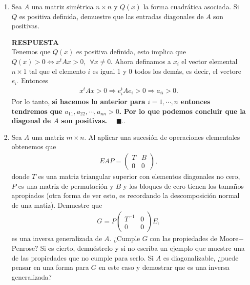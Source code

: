\documentclass[11pt,letterpaper]{article}
\newcommand{\res}{\textbf{RESPUESTA}\\}
\newcommand{\fin}{$\blacksquare.$}
\begin{document}
\begin{enumerate}
\item Sea $A$ una matriz simétrica $n\times n$ y $Q(x)$ la forma cuadrática asociada. Si $Q$ es positiva definida, demuestre que las entradas diagonales de $A$ son positivas. 

\res Tenemos que $Q(x)$ es positiva definida, esto implica que $Q(x)>0 \Leftrightarrow x^t Ax>0, \ \ \forall x\neq 0$. Ahora definamos a $x_i$ el vector elemental $n\times 1$ tal que el elemento $i$ es igual 1 y 0 todos los demás, es decir, el vectore $e_i$. Entonces 
\begin{align*}
x^tAx>0 \Rightarrow e_i^tAe_i>0 \Rightarrow a_{ii}>0.
\end{align*} 
Por lo tanto, \textbf{si hacemos lo anterior para $i=1,\cdots, n$ entonces tendremos que $a_{11}, a_{22}, \cdots, a_{nn}>0$. Por lo que podemos concluir que la diagonal de $A$ son positivas.} \ \ \fin.


\item Sea $A$ una matriz $m \times n$. Al aplicar una sucesión de operaciones elementales obtenemos que 
\begin{align*}
EAP=\begin{pmatrix}
T & B \\
0 & 0
\end{pmatrix},
\end{align*}
donde $T$ es una matriz triangular superior con elementos diagonales no cero, $P$ es una matriz de permutación y $B$ y los bloques de cero tienen los tamaños apropiados (otra forma de ver esto, es recordando la descomposición normal de una matiz). Demuestre que 
\begin{align*}
G=P\begin{pmatrix}
T^{-1} & 0\\
0 & 0
\end{pmatrix}E,
\end{align*}
es una inversa generalizada de $A$. ¿Cumple $G$ con las propiedades de Moore$-$Penrose? Si es cierto, demuéstrelo y si no escriba un ejemplo que muestre una de las propiedades que no cumple para serlo. Si $A$ es diagonalizable, ¿puede pensar en una forma para $G$ en este caso y demostrar que es una inversa generalizada?


\end{enumerate}
\end{document}
